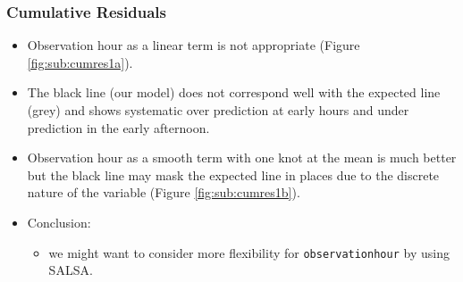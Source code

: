 \documentclass[11pt, a4paper]{article}
\begin{document}
\begin{frame}
\frametitle{Cumulative Residuals}
\begin{itemize}
\item Observation hour as a linear term is not appropriate (Figure \ref{fig:sub:cumres1a}).
\item The black line (our model) does not correspond well with the expected line (grey) and shows systematic over prediction at early hours and under prediction in the early afternoon.
\item Observation hour as a smooth term with one knot at the mean is much better but the black line may mask the expected line in places due to the discrete nature of the variable (Figure \ref{fig:sub:cumres1b}).
\pause
\item Conclusion:  
\begin{itemize}
  \item we might want to consider more flexibility for {\tt observationhour} by using SALSA.
\end{itemize}
\end{itemize}
\end{frame}
\end{document}
